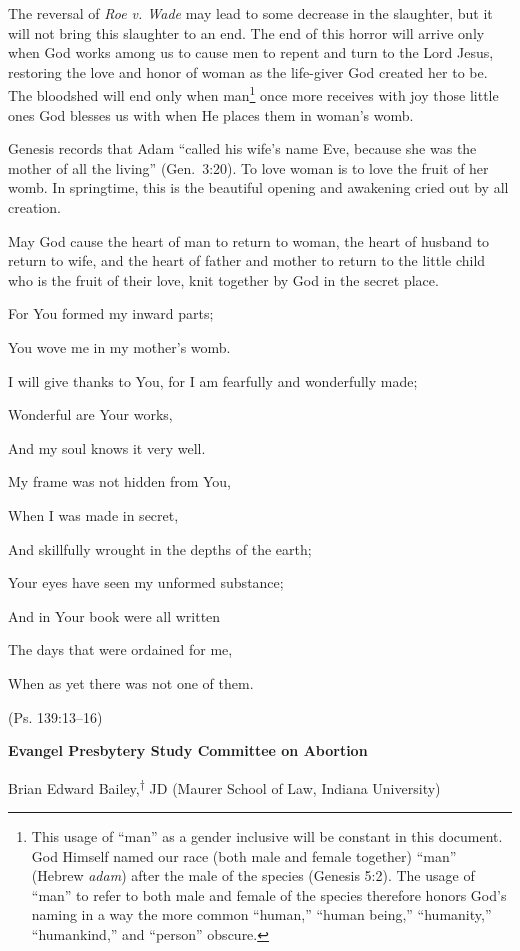 \documentclass[
]{book}
\begin{document}
The reversal of \emph{Roe v. Wade} may lead to some decrease in the slaughter, but it will not bring this slaughter to an end. The end of this horror will arrive only when God works among us to cause men to repent and turn to the Lord Jesus, restoring the love and honor of woman as the life-giver God created her to be. The bloodshed will end only when man\footnote{This usage of ``man'' as a gender inclusive will be constant in this document. God Himself named our race (both male and female together) ``man'' (Hebrew \emph{adam}) after the male of the species (Genesis 5:2). The usage of ``man'' to refer to both male and female of the species therefore honors God's naming in a way the more common ``human,'' ``human being,'' ``humanity,'' ``humankind,'' and ``person'' obscure.} once more receives with joy those little ones God blesses us with when He places them in woman's womb.

Genesis records that Adam ``called his wife's name Eve, because she was the mother of all the living'' (Gen.~3:20). To love woman is to love the fruit of her womb. In springtime, this is the beautiful opening and awakening cried out by all creation.

May God cause the heart of man to return to woman, the heart of husband to return to wife, and the heart of father and mother to return to the little child who is the fruit of their love, knit together by God in the secret place.

For You formed my inward parts;

You wove me in my mother's womb.

I will give thanks to You, for I am fearfully and wonderfully made;

Wonderful are Your works,

And my soul knows it very well.

My frame was not hidden from You,

When I was made in secret,

And skillfully wrought in the depths of the earth;

Your eyes have seen my unformed substance;

And in Your book were all written

The days that were ordained for me,

When as yet there was not one of them.

(Ps. 139:13--16)

\textbf{Evangel Presbytery Study Committee on Abortion}

Brian Edward Bailey,\textsuperscript{†} JD (Maurer School of Law, Indiana University)
\end{document}
